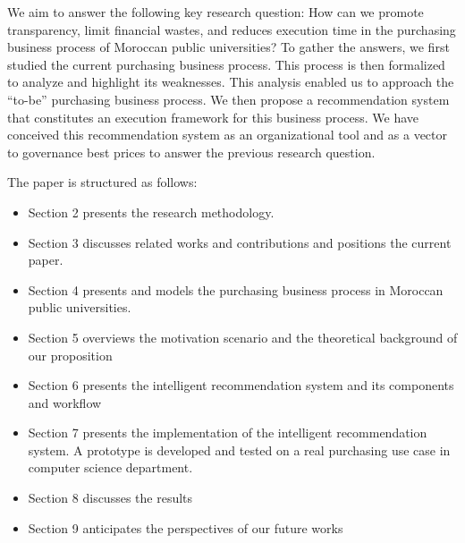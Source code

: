 \documentclass[preprint,3p,onecolumn]{elsarticle}
\begin{document}
\par We aim to answer the following key research question: How can we promote transparency, limit financial wastes, and reduces execution time in the purchasing business process of Moroccan public universities? To gather the answers, we first studied the current purchasing business process. This process is then formalized to analyze and highlight its weaknesses. This analysis enabled us to approach the “to-be” purchasing business process. We then propose a recommendation system that constitutes an execution framework for this business process. We have conceived this recommendation system as an organizational tool and as a vector to governance best prices to answer the previous research question.

\par The paper is structured as follows:

\begin{itemize}
\item Section 2 presents the research methodology.
\item Section 3 discusses related works and contributions and positions the current paper.
\item Section 4 presents and models the purchasing business process in Moroccan public universities.
\item Section 5 overviews the motivation scenario and the theoretical background of our proposition
\item Section 6 presents the intelligent recommendation system and its components and workflow
\item Section 7 presents the implementation of the intelligent recommendation system.  A prototype is developed and tested on a real purchasing use case in computer science department.
\item Section 8 discusses the results
\item Section 9 anticipates the perspectives of our future works 
\end{itemize}
\end{document}

